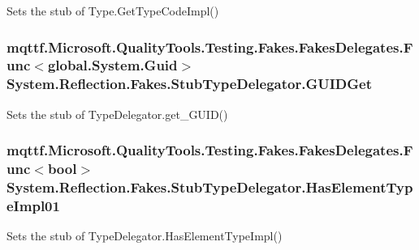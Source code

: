 Sets the stub of Type.\-Get\-Type\-Code\-Impl()

\hypertarget{class_system_1_1_reflection_1_1_fakes_1_1_stub_type_delegator_aac3ba8a1bb19e7d3879d708bd54fe156}{
\subsubsection[{G\-U\-I\-D\-Get}]{\setlength{\rightskip}{0pt plus 5cm}mqttf.\-Microsoft.\-Quality\-Tools.\-Testing.\-Fakes.\-Fakes\-Delegates.\-Func$<$global.\-System.\-Guid$>$ System.\-Reflection.\-Fakes.\-Stub\-Type\-Delegator.\-G\-U\-I\-D\-Get}}\label{class_system_1_1_reflection_1_1_fakes_1_1_stub_type_delegator_aac3ba8a1bb19e7d3879d708bd54fe156}


Sets the stub of Type\-Delegator.\-get\-\_\-\-G\-U\-I\-D()

\hypertarget{class_system_1_1_reflection_1_1_fakes_1_1_stub_type_delegator_a3d89bfa495fdd2219412f4ce8c0e78c3}{
\subsubsection[{Has\-Element\-Type\-Impl01}]{\setlength{\rightskip}{0pt plus 5cm}mqttf.\-Microsoft.\-Quality\-Tools.\-Testing.\-Fakes.\-Fakes\-Delegates.\-Func$<$bool$>$ System.\-Reflection.\-Fakes.\-Stub\-Type\-Delegator.\-Has\-Element\-Type\-Impl01}}\label{class_system_1_1_reflection_1_1_fakes_1_1_stub_type_delegator_a3d89bfa495fdd2219412f4ce8c0e78c3}


Sets the stub of Type\-Delegator.\-Has\-Element\-Type\-Impl()

